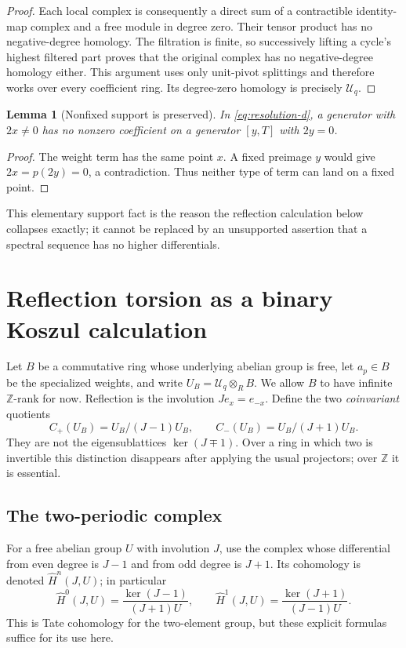 \documentclass[11pt]{article}
\numberwithin{equation}{section}
\newtheorem{lemma}[theorem]{Lemma}
\theoremstyle{definition}
\theoremstyle{remark}
\newcommand{\Z}{\mathbb Z}
\newcommand{\U}{\mathcal U}
\newcommand{\HH}{\widehat H}
\begin{document}
\begin{proof}
Each local complex is consequently a direct sum of a contractible
identity-map complex and a free module in degree zero. Their tensor
product has no negative-degree homology. The filtration is finite, so
successively lifting a cycle's highest filtered part proves that the
original complex has no negative-degree homology either. This argument
uses only unit-pivot splittings and therefore works over every
coefficient ring. Its degree-zero homology is precisely $\U_q$.
\end{proof}

\begin{lemma}[Nonfixed support is preserved]
\label{lem:nonfixed}
In \eqref{eq:resolution-d}, a generator with $2x\ne0$ has no nonzero
coefficient on a generator $[y,T]$ with $2y=0$.
\end{lemma}
\begin{proof}
The weight term has the same point $x$. A fixed preimage $y$ would give
$2x=p(2y)=0$, a contradiction. Thus neither type of term can land on a
fixed point.
\end{proof}
This elementary support fact is the reason the reflection calculation
below collapses exactly; it cannot be replaced by an unsupported
assertion that a spectral sequence has no higher differentials.

\section{Reflection torsion as a binary Koszul calculation}
\label{sec:reflection}
Let $B$ be a commutative ring whose underlying abelian group is free,
let $a_p\in B$ be the specialized weights, and write
$U_B=\U_q\otimes_R B$. We allow $B$ to have infinite $\Z$-rank for
now. Reflection is the involution $Je_x=e_{-x}$. Define the two
\emph{coinvariant} quotients
\begin{equation}
 C_+(U_B)=U_B/(J-1)U_B,\qquad
 C_-(U_B)=U_B/(J+1)U_B.
 \label{eq:coinvariants}
\end{equation}
They are not the eigensublattices $\ker(J\mp1)$. Over a ring in which
two is invertible this distinction disappears after applying the usual
projectors; over $\Z$ it is essential.

\subsection{The two-periodic complex}
For a free abelian group $U$ with involution $J$, use the complex whose
differential from even degree is $J-1$ and from odd degree is $J+1$.
Its cohomology is denoted $\HH^n(J,U)$; in particular
\[
 \HH^0(J,U)=\frac{\ker(J-1)}{(J+1)U},\qquad
 \HH^1(J,U)=\frac{\ker(J+1)}{(J-1)U}.
\]
This is Tate cohomology for the two-element group, but these explicit
formulas suffice for its use here.
\end{document}
